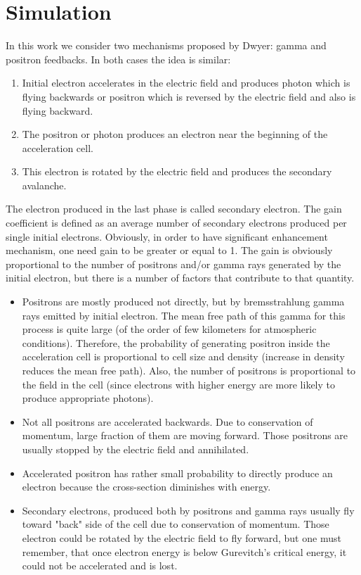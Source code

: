 \documentclass[utf8]{webofc}
\begin{document}
    \section{Simulation}
    \label{sec:Sim}
    In this work we consider two mechanisms proposed by Dwyer: gamma and positron feedbacks. 
    In both cases the idea is similar:
    \begin{enumerate}
        
        \item Initial electron accelerates in the electric field and produces photon which is flying backwards or positron which is reversed by the electric field and also is flying backward.
        
        \item The positron or photon produces an electron near the beginning of the acceleration cell.
        
        \item This electron is rotated by the electric field and produces the secondary avalanche. 
        
    \end{enumerate}
    
    The electron produced in the last phase is called secondary electron. The gain coefficient is defined as an average number of secondary electrons produced per single initial electrons. Obviously, in order to have significant enhancement mechanism, one need gain to be greater or equal to 1. 
    The gain is obviously proportional to the number of positrons and/or gamma rays generated by the initial electron, but there is a number of factors that contribute to that quantity.
    
    \begin{itemize}
        \item Positrons are mostly produced not directly, but by bremsstrahlung gamma rays emitted by initial electron. The mean free path of this gamma for this process is quite large (of the order of few kilometers for atmospheric conditions). Therefore, the probability of generating positron inside the acceleration cell is proportional to cell size and density (increase in density reduces the mean free path). Also, the number of positrons is proportional to the field in the cell (since electrons with higher energy are more likely to produce appropriate photons).
        \item Not all positrons are accelerated backwards. Due to conservation of momentum, large fraction of them are moving forward. Those positrons are usually stopped by the electric field and annihilated.
        \item Accelerated positron has rather small probability to directly produce an electron because the cross-section diminishes with energy.
        \item Secondary electrons, produced both by positrons and gamma rays usually fly toward "back" side of the cell due to conservation of momentum. Those electron could be rotated by the electric field to fly forward, but one must remember, that once electron energy is below Gurevitch's critical energy, it could not be accelerated and is lost.
    \end{itemize}
    
\end{document}
